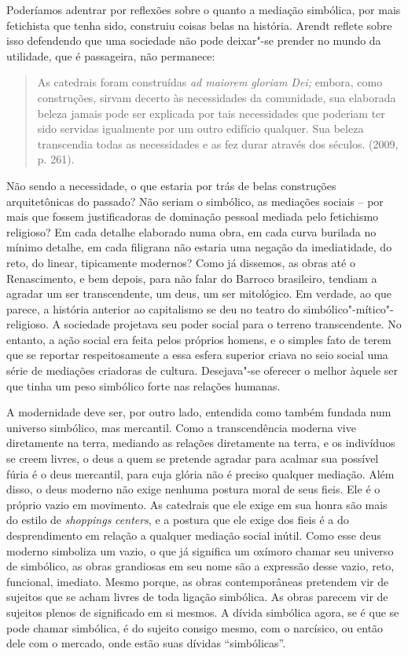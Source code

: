 Poderíamos adentrar por reflexões sobre o quanto a mediação simbólica,
por mais fetichista que tenha sido, construiu coisas belas na história.
Arendt reflete sobre isso defendendo que uma sociedade não pode
deixar"-se prender no mundo da utilidade, que é passageira, não
permanece:

\begin{quote}
As catedrais foram construídas \emph{ad maiorem gloriam Dei;} embora,
como construções, sirvam decerto às necessidades da comunidade, sua
elaborada beleza jamais pode ser explicada por tais necessidades que
poderiam ter sido servidas igualmente por um outro edifício qualquer.
Sua beleza transcendia todas as necessidades e as fez durar através dos
séculos. (2009, p. 261).
\end{quote}

Não sendo a necessidade, o que estaria por trás de belas construções
arquitetônicas do passado? Não seriam o simbólico, as mediações sociais
-- por mais que fossem justificadoras de dominação pessoal mediada pelo
fetichismo religioso? Em cada detalhe elaborado numa obra, em cada curva
burilada no mínimo detalhe, em cada filigrana não estaria uma negação da
imediatidade, do reto, do linear, tipicamente modernos? Como já
dissemos, as obras até o Renascimento, e bem depois, para não falar do
Barroco brasileiro, tendiam a agradar um ser transcendente, um deus, um
ser mitológico. Em verdade, ao que parece, a história anterior ao
capitalismo se deu no teatro do simbólico"-mítico"-religioso. A sociedade
projetava seu poder social para o terreno transcendente. No entanto, a
ação social era feita pelos próprios homens, e o simples fato de terem
que se reportar respeitosamente a essa esfera superior criava no seio
social uma série de mediações criadoras de cultura. Desejava"-se oferecer
o melhor àquele ser que tinha um peso simbólico forte nas relações
humanas.

A modernidade deve ser, por outro lado, entendida como também fundada
num universo simbólico, mas mercantil. Como a transcendência moderna
vive diretamente na terra, mediando as relações diretamente na terra, e
os indivíduos se creem livres, o deus a quem se pretende agradar para
acalmar sua possível fúria é o deus mercantil, para cuja glória não é
preciso qualquer mediação. Além disso, o deus moderno não exige nenhuma
postura moral de seus fieis. Ele é o próprio vazio em movimento. As
catedrais que ele exige em sua honra são mais do estilo de
\emph{shoppings} \emph{centers}, e a postura que ele exige dos fieis é a
do desprendimento em relação a qualquer mediação social inútil. Como
esse deus moderno simboliza um vazio, o que já significa um oxímoro
chamar seu universo de simbólico, as obras grandiosas em seu nome são a
expressão desse vazio, reto, funcional, imediato. Mesmo porque, as obras
contemporâneas pretendem vir de sujeitos que se acham livres de toda
ligação simbólica. As obras parecem vir de sujeitos plenos de
significado em si mesmos. A dívida simbólica agora, se é que se pode
chamar simbólica, é do sujeito consigo mesmo, com o narcísico, ou então
dele com o mercado, onde estão suas dívidas ``simbólicas''.


